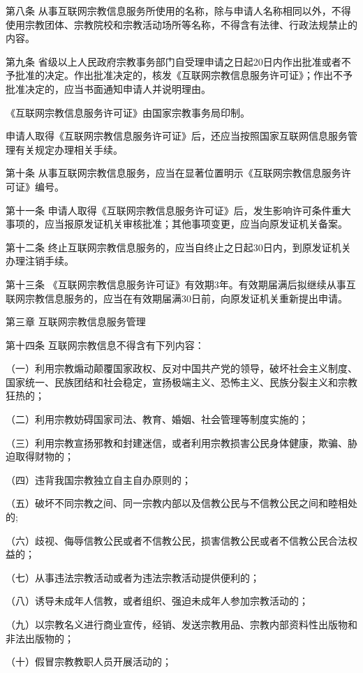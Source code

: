 \documentclass[UTF8, 11pt, oneside]{ctexart}
\newcommand{\juzhong}[1]{\begin{center}#1\end{center}}
\newcommand{\kongge}{\hspace{0.5em}}
\begin{document}
第八条 \kongge 从事互联网宗教信息服务所使用的名称，除与申请人名称相同以外，不得使用宗教团体、宗教院校和宗教活动场所等名称，不得含有法律、行政法规禁止的内容。

第九条 \kongge 省级以上人民政府宗教事务部门自受理申请之日起20日内作出批准或者不予批准的决定。作出批准决定的，核发《互联网宗教信息服务许可证》；作出不予批准决定的，应当书面通知申请人并说明理由。

《互联网宗教信息服务许可证》由国家宗教事务局印制。

申请人取得《互联网宗教信息服务许可证》后，还应当按照国家互联网信息服务管理有关规定办理相关手续。

第十条 \kongge 从事互联网宗教信息服务，应当在显著位置明示《互联网宗教信息服务许可证》编号。

第十一条 \kongge 申请人取得《互联网宗教信息服务许可证》后，发生影响许可条件重大事项的，应当报原发证机关审核批准；其他事项变更，应当向原发证机关备案。

第十二条 \kongge 终止互联网宗教信息服务的，应当自终止之日起30日内，到原发证机关办理注销手续。

第十三条 \kongge 《互联网宗教信息服务许可证》有效期3年。有效期届满后拟继续从事互联网宗教信息服务的，应当在有效期届满30日前，向原发证机关重新提出申请。

\juzhong{第三章 \kongge 互联网宗教信息服务管理}

第十四条 \kongge 互联网宗教信息不得含有下列内容：

（一）利用宗教煽动颠覆国家政权、反对中国共产党的领导，破坏社会主义制度、国家统一、民族团结和社会稳定，宣扬极端主义、恐怖主义、民族分裂主义和宗教狂热的；

（二）利用宗教妨碍国家司法、教育、婚姻、社会管理等制度实施的；

（三）利用宗教宣扬邪教和封建迷信，或者利用宗教损害公民身体健康，欺骗、胁迫取得财物的；

（四）违背我国宗教独立自主自办原则的；

（五）破坏不同宗教之间、同一宗教内部以及信教公民与不信教公民之间和睦相处的;

（六）歧视、侮辱信教公民或者不信教公民，损害信教公民或者不信教公民合法权益的；

（七）从事违法宗教活动或者为违法宗教活动提供便利的；

（八）诱导未成年人信教，或者组织、强迫未成年人参加宗教活动的；

（九）以宗教名义进行商业宣传，经销、发送宗教用品、宗教内部资料性出版物和非法出版物的；

（十）假冒宗教教职人员开展活动的；
\end{document}
